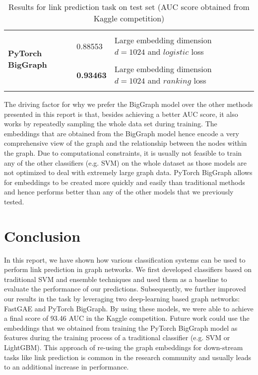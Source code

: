 \documentclass[11pt, oneside]{article}
\begin{document}
\begin{table}
\begin{tiny}
\begin{tabularx}{\textwidth}{p{3cm} p{5cm} p{2cm} p{6.5cm}}
\midrule
 \multirow{4}{*}{\textbf{PyTorch BigGraph}} & \begin{tabular}{@{}l @{}} $\eta = 0.001$, $loss = logistic$ \\ $n_{epochs}=50$, $d_{embedding}=1024$ \end{tabular} & 0.88553 & Large embedding dimension $d=1024$ and $logistic$ loss\\
\addlinespace[0.2cm]
   & \begin{tabular}{@{}l @{}} $\eta = 0.001$, $loss = ranking$  \\ $n_{epochs}=50$, $d_{embeddings}=1024$  \end{tabular} & \textbf{0.93463} & Large embedding dimension $d=1024$ and $ranking$ loss \\
 \addlinespace[0.1cm]
\bottomrule
\end{tabularx}
\caption{Results for link prediction task on test set (AUC score obtained from Kaggle competition)}
\label{tbl:results}
\end{tiny}
\end{table}
The driving factor for why we prefer the BigGraph model over the other methods presented in this report is that, besides achieving a better AUC score, it also works by repeatedly sampling the whole data set during training. The embeddings that are obtained from the BigGraph model hence encode a very comprehensive view of the graph and the relationship between the nodes within the graph. Due to computational constraints, it is usually not feasible to train any of the other classifiers (e.g. SVM) on the whole dataset as those models are not optimized to deal with extremely large graph data. PyTorch BigGraph allows for embeddings to be created more quickly and easily than traditional methods and hence performs better than any of the other models that we previously tested. 
\vspace{-10pt}
\section{Conclusion}
\vspace{-5pt}
In this report, we have shown how various classification systems can be used to perform link prediction in graph networks. We first developed classifiers based on traditional SVM and ensemble techniques and used them as a baseline to evaluate the performance of our predictions. Subsequently, we further improved our results in the task by leveraging two deep-learning based graph networks: FastGAE and PyTorch BigGraph. By using these models, we were able to achieve a final score of 93.46 AUC in the Kaggle competition.
\newline
Future work could use the embeddings that we obtained from training the PyTorch BigGraph model as features during the training process of a traditional classifier (e.g. SVM or LightGBM). This approach of re-using the graph embeddings for down-stream tasks like link prediction is common in the research community and usually leads to an additional increase in performance.
\printbibliography[heading=bibintoc]
\end{document}
